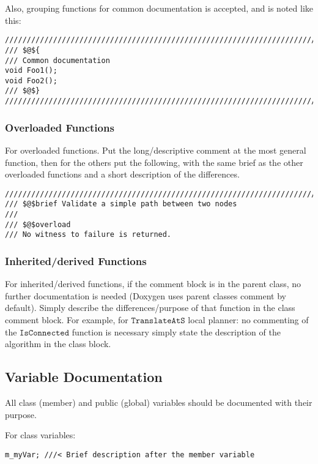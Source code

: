 \documentclass[12pt]{article}
\begin{document}
Also, grouping functions for common documentation is accepted, and is noted like
this:

\begin{lstlisting}[mathescape]
///////////////////////////////////////////////////////////////////////////////
/// $@${
/// Common documentation
void Foo1();
void Foo2();
/// $@$}
///////////////////////////////////////////////////////////////////////////////
\end{lstlisting}

\subsubsection{Overloaded Functions}

For overloaded functions. Put the long/descriptive comment at the most general
function, then for the others put the following, with the same brief as the
other overloaded functions and a short description of the differences.

\begin{lstlisting}[mathescape]
///////////////////////////////////////////////////////////////////////////////
/// $@$brief Validate a simple path between two nodes
///
/// $@$overload
/// No witness to failure is returned.
\end{lstlisting}

\subsubsection{Inherited/derived Functions}
For inherited/derived functions, if the comment block is in the parent class,
no further documentation is needed (Doxygen uses parent classes comment by
default). Simply describe the differences/purpose of that function in the class
comment block. For example, for $\mathtt{TranslateAtS}$ local planner: no
commenting of the $\mathtt{IsConnected}$ function is necessary simply state the
description of the algorithm in the class block.

\subsection{Variable Documentation}

All class (member) and public (global) variables should be documented with their
purpose.

For class variables:
\begin{lstlisting}
m_myVar; ///< Brief description after the member variable
\end{lstlisting}
\end{document}
